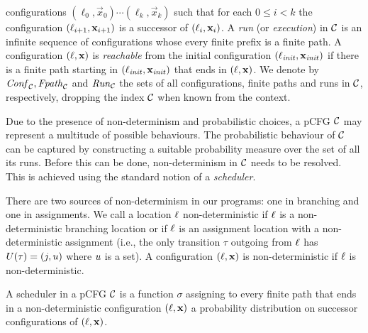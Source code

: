 configurations $(\ell_0,\vec{x}_0)\cdots(\ell_k,\vec{x}_k)$ such that 
for each
$0 \leq i < k$ the configuration $(\ell_{i+1},\mathbf{x}_{i+1})$ is a successor of 
$(\ell_i,\mathbf{x}_i)$.
A \emph{run} (or \emph{execution}) in
$\mathcal{C}$ is an infinite sequence of configurations whose every finite
prefix is a finite path.
A configuration $(\ell,\mathbf{x})$ is {\em reachable} from the initial 
configuration
$(\ell_{\mathit{init}},\mathbf{x}_{\mathit{init}})$
if there is a finite path starting in $(\ell_{\mathit{init}},\mathbf{x}_{\mathit{init}})$ that ends in
$(\ell,\mathbf{x})$. We denote by $\mathit{Conf}_{\mathcal{C}},\mathit{Fpath}_{\mathcal{C}}$ and $\mathit{Run}_{\mathcal{C}}$ the 
sets of all configurations, finite paths and runs in $\mathcal{C}$, respectively, 
dropping the index $\mathcal{C}$ when known from the context.


\smallskip{}
Due to the presence of non-determinism and probabilistic choices, a pCFG
$\mathcal{C}$ may represent a multitude of possible behaviours. The probabilistic
behaviour of $\mathcal{C}$ can be captured by constructing a suitable
probability measure over the set of all its runs. Before this can be
done, non-determinism in $\mathcal{C}$ needs to be resolved. This is achieved using 
the 
standard notion of a \emph{scheduler}. 

There are two sources of non-determinism in our programs: one in branching and 
one in assignments. We call a location $\ell$ non-deterministic if $\ell$ is a 
non-deterministic branching location or if $\ell$ is an assignment location 
with a 
non-deterministic assignment (i.e., the only transition $\tau$ outgoing from 
$\ell$ has $U(\tau)=(j,u)$ where $u$ is a set). A configuration 
$(\ell,\mathbf{x})$ is non-deterministic if $\ell$ is non-deterministic.

\smallskip
\begin{definition}[Schedulers]
\label{def:schedulers}
A scheduler in a pCFG $\mathcal{C}$ is a function $\sigma$
 assigning 
to every finite path that ends in a non-deterministic configuration 
$(\ell,\mathbf{x})$ a probability distribution on successor configurations of 
$(\ell,\mathbf{x})$.

\end{definition}

